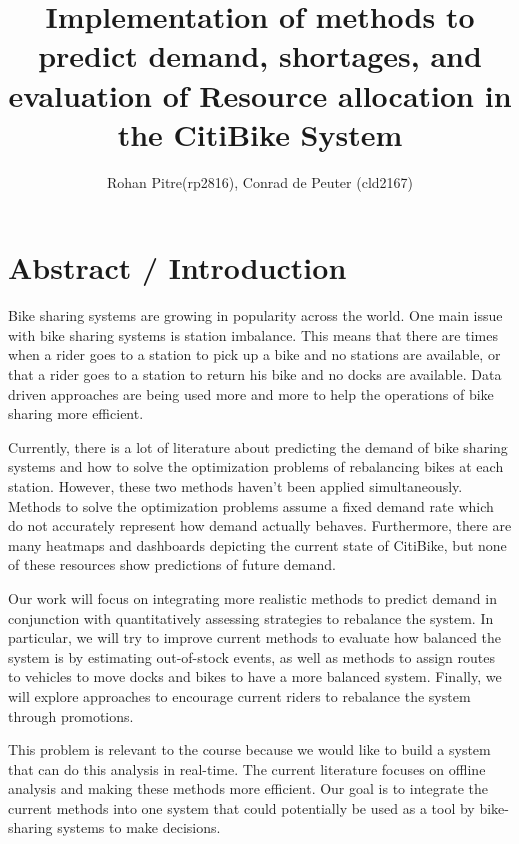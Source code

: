 \documentclass{proc}
\begin{document}
\title{Implementation of methods to predict demand, shortages, and evaluation of Resource allocation in the CitiBike System}

\author{Rohan Pitre(rp2816), Conrad de Peuter (cld2167)}

\maketitle

\section{Abstract / Introduction}



Bike sharing systems are growing in popularity across the world. One main issue with bike sharing systems is station imbalance. This means that there are times when a rider goes to a station to pick up a bike and no stations are available, or that a rider goes to a station to return his bike and no docks are available. Data driven approaches are being used more and more to help the operations of bike sharing more efficient. 

Currently, there is a lot of literature about predicting the demand of bike sharing systems and how to solve the optimization problems of rebalancing bikes at each station. However, these two methods haven't been applied simultaneously. Methods to solve the optimization problems assume a fixed demand rate which do not accurately represent how demand actually behaves. Furthermore, there are many heatmaps and dashboards depicting the current state of CitiBike, but none of these resources show predictions of future demand.

Our work will focus on integrating more realistic methods to predict demand in conjunction with quantitatively assessing strategies to rebalance the system. In particular, we will try to improve current methods to evaluate how balanced the system is by estimating out-of-stock events, as well as methods to assign routes to vehicles to move docks and bikes to have a more balanced system. Finally, we will explore approaches to encourage current riders to rebalance the system through promotions.

This problem is relevant to the course because we would like to build a system that can do this analysis in real-time. The current literature focuses on offline analysis and making these methods more efficient. Our goal is to integrate the current methods into one system that could potentially be used as a tool by bike-sharing systems to make decisions. 
\end{document}
